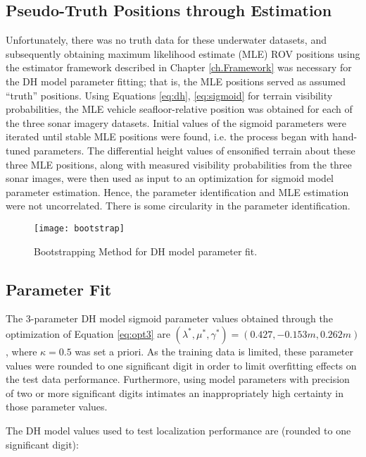 \subsection{Pseudo-Truth Positions through Estimation}
\label{rov.dhFit.Pseudo}

Unfortunately, there was no truth data for these underwater datasets, and subsequently obtaining maximum likelihood estimate (MLE) ROV positions using the estimator framework described in Chapter \ref{ch.Framework} was necessary for the DH model parameter fitting; that is, the MLE positions served as assumed ``truth'' positions. Using Equations \ref{eq:dh}, \ref{eq:sigmoid} for terrain visibility probabilities, the MLE vehicle seafloor-relative position was obtained for each of the three sonar imagery datasets.  Initial values of the sigmoid parameters were iterated until stable MLE positions were found, i.e. the process began with hand-tuned parameters.  The differential height values of ensonified terrain about these three MLE positions, along with measured visibility probabilities from the three sonar images, were then used as input to an optimization for sigmoid model parameter estimation.  Hence, the parameter identification and MLE estimation were not uncorrelated. There is some circularity in the parameter identification.  

\begin{figure}[H]
	\centering
		\texttt{[image: bootstrap]}
	\caption{Bootstrapping Method for DH model parameter fit. }
	\label{fig:bootstrap}
\end{figure}

\subsection{Parameter Fit}
\label{rov.dhFit.Parameter}

The 3-parameter DH model sigmoid parameter values obtained through the optimization of Equation \ref{eq:opt3} are $(\lambda^*, \mu^*, \gamma^*) = (0.427, -0.153m, 0.262m)$, where $\kappa = 0.5$ was set a priori. As the training data is limited, these parameter values were rounded to one significant digit in order to limit overfitting effects on the test data performance. Furthermore, using model parameters with precision of two or more significant digits intimates an inappropriately high certainty in those parameter values. 

The DH model values used to test localization performance are (rounded to one significant digit):

